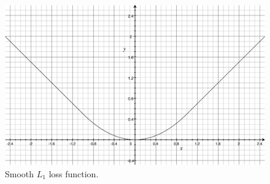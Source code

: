 \begin{figure}[!h]
	\centering
	\includegraphics[width=\figfi\textwidth]{3-10.pdf}
    \caption[Smooth $L_1$ loss function]{Smooth $L_1$ loss function.}
    \label{fig:l1loss}
\end{figure}